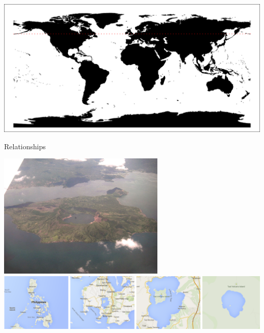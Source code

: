 \documentclass[11pt,ignorenonframetext,]{beamer}
\begin{document}
\begin{frame}{}

\begin{center}\includegraphics{Lec16_files/figure-beamer/unnamed-chunk-7-1} \end{center}

\end{frame}

\begin{frame}{Relationships}

\begin{center}
\includegraphics[width=0.6\textwidth]{figs/Taal.png} \\
\includegraphics[width=\textwidth]{figs/taal_seq.png}
\end{center}

\end{frame}
\end{document}
